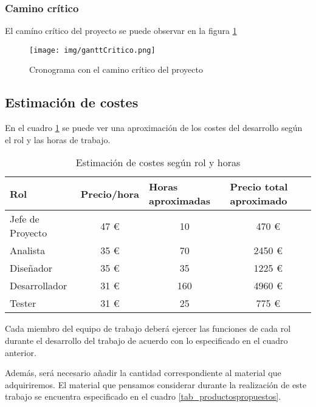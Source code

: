 \subsubsection{Camino crítico}
El camíno crítico del proyecto se puede observar en la figura \ref{fig_camcritic}
\begin{figure}[h]
    \centering
    \texttt{[image: img/ganttCritico.png]}
    \caption{Cronograma con el camino crítico del proyecto}
    \label{fig_camcritic}
\end{figure}

\subsection{Estimación de costes}

En el cuadro \ref{tab_costesriol} se puede ver una aproximación de los costes del desarrollo según el rol y las horas de trabajo.

\begin{table}[h]
\centering
\begin{tabular}{@{}lccc@{}}
\toprule
Rol & \multicolumn{1}{l}{Precio/hora} & \multicolumn{1}{l}{Horas aproximadas} & \multicolumn{1}{l}{Precio total aproximado} \\ \midrule
Jefe de Proyecto & 47 € & 10 & 470 € \\
Analista & 35 € & 70 & 2450 €\\
Diseñador & 35 € & 35 & 1225 €\\
Desarrollador & 31 € & 160 & 4960 €\\
Tester & 31 € & 25 & 775 €\\ \bottomrule
\end{tabular}
\caption{Estimación de costes según rol y horas}
\label{tab_costesriol}
\end{table}

Cada miembro del equipo de trabajo deberá ejercer las funciones de cada rol durante el desarrollo del trabajo de acuerdo con lo especificado en el cuadro anterior.

Además, será necesario añadir la cantidad correspondiente al material que adquiriremos.
El material que pensamos considerar durante la realización de este trabajo se encuentra especificado en el cuadro \ref{tab_productospropuestos}.


